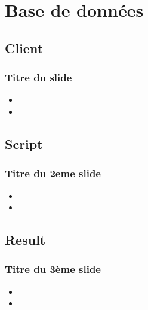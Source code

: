 \section{Base de données}

\subsection{Client}
		\begin{frame}
		    \frametitle{\textbf{Titre du slide}}
			\begin{itemize}
				 \item 
				 \item 
			\end{itemize}
		\end{frame}

\subsection{Script}
	\begin{frame}
		\frametitle{\textbf{Titre du 2eme slide}}
		\begin{itemize}
			\item 
			\item 
		\end{itemize}
	\end{frame}

\subsection{Result}
	\begin{frame}
		\frametitle{\textbf{Titre du 3ème slide}}
		\begin{itemize}
			\item
			\item
		\end{itemize}
	\end{frame}

